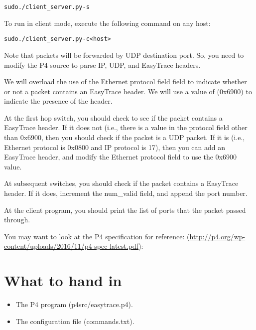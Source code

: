 \documentclass{article}
\begin{document}
 
\begin{alltt}
sudo ./client\_server.py -s
\end{alltt}

\noindent
 To run in client mode, execute the following command on any host:

\begin{alltt}
sudo ./client\_server.py -c <host>
\end{alltt}


\noindent
Note that packets will be forwarded by UDP destination port. So, you need to modify the P4 source
to parse IP, UDP, and EasyTrace headers.

We will overload the use of the Ethernet protocol field
field to indicate whether or not a packet contains an  EasyTrace header.
We will use a value of (0x6900) to indicate the presence of the header.

At the first hop switch, you should check to see if the packet contains a EasyTrace header. If it does
not (i.e., there is a value in the protocol field other than 0x6900, then you should check if
the packet is a UDP packet. If it is (i.e., Ethernet protocol is 0x0800 and IP protocol is 17), then
you can add an EasyTrace header, and modify the Ethernet protocol field to use the 0x6900 value.

At subsequent switches, you should check if the  packet contains a EasyTrace header. If it does,
increment the num\_valid field, and append the port number.

At the client program, you should print the list of ports that the packet passed through.

You may want to look at the P4 specification for reference:
  (\url{http://p4.org/wp-content/uploads/2016/11/p4-spec-latest.pdf}):



 \section*{What to hand in}
 \begin{itemize}
 \item The P4 program (p4src/easytrace.p4).
 \item The configuration file (commands.txt).
 \end{itemize}
\end{document}
